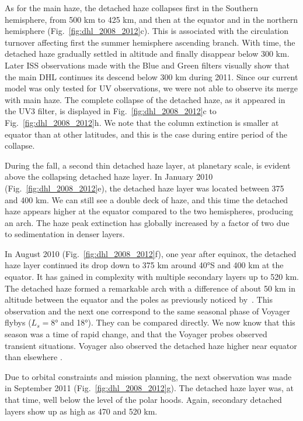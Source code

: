 As for the main haze, the detached haze collapses first in the Southern hemisphere, from 500 km to 425 km, and
then at the equator and in the northern hemisphere (Fig.~\ref{fig:dhl_2008_2012}c).
This is associated with the circulation turnover affecting first the summer hemisphere ascending branch.
With time, the detached haze gradually settled in altitude and finally disappear below 300 km.
Later ISS observations made with the Blue and Green filters visually show that the main DHL continues
its descend below 300 km during 2011. Since our current model was only tested for UV observations, we were not able
to observe its merge with main haze.
The complete collapse of the detached haze, as it appeared in the UV3 filter, is displayed in Fig.~\ref{fig:dhl_2008_2012}c to
Fig.~\ref{fig:dhl_2008_2012}h. We note that the column extinction is smaller at equator than at
other latitudes, and this is the case during entire period of the collapse.

During the fall, a second thin detached haze layer, at planetary scale, is evident above the collapsing detached
haze layer. In January 2010 (Fig.~\ref{fig:dhl_2008_2012}e), the detached haze layer was located between 375 and 400 km.
We can still see a double deck of haze, and this time the detached haze appears higher at the equator compared to the two
hemispheres, producing an arch. The haze peak extinction has globally increased by a factor of two due to sedimentation
in denser layers.

In August 2010 (Fig.~\ref{fig:dhl_2008_2012}f), one year after equinox, the detached haze layer continued
its drop down to 375 km around \ang{40}S and 400 km at the equator. It has gained in complexity with
multiple secondary layers up to 520 km. The detached haze formed a remarkable arch with a difference of about 50 km
in altitude between the equator and the poles as previously noticed by~\cite{West2011}.
This observation and the next one correspond to the same seasonal phase  of Voyager flybys ($L_s=\ang{8}$ and \ang{18}).
They can be compared directly.
We now know that this season was a time of rapid change, and that the Voyager probes observed transient situations.
Voyager also observed the detached haze higher near equator than elsewhere \citep{Rages1983, Rannou2000}.

Due to orbital constraints and mission planning, the next observation was made in September 2011
(Fig.~\ref{fig:dhl_2008_2012}g). The detached haze layer was, at that time, well below the level of the polar hoods.
Again, secondary detached layers show up as high as 470 and 520 km.

